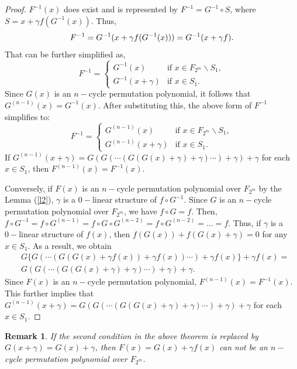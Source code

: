 \documentclass[12pt,a4paper]{article}
\newtheorem{remark}{Remark}[section]
\begin{document}
\begin{proof}
    $ F^{-1}(x) $ does exist and is represented by  $ F^{-1}=G^{-1}\circ S $, where $ S=x+\gamma f(G^{-1}(x)) $. Thus,
	\begin{equation}
		F^{-1}=G^{-1}(x+\gamma f(G^{-1}(x)))\\
		=G^{-1}(x+\gamma f).
	\end{equation}
	That can be further simplified as,
	\begin{equation}
		F^{-1}=\begin{cases}
			G^{-1}(x) & \text{if } x\in F_{2^{m}}\backslash S_{1},\\
			G^{-1}(x+\gamma) & \text{if } x\in S_{1}.
		\end{cases}
	\end{equation}
	Since $ G(x) $ is an $ n-$cycle permutation polynomial, it follows that $ G^{(n-1)}(x)=G^{-1}(x) $. After substituting this, the above form of $F^{-1}$ simplifies to:
	\begin{equation}
		F^{-1}=\begin{cases}
			G^{(n-1)}(x) & \text{if } x\in F_{2^{m}}\backslash S_{1},\\
			G^{(n-1)}(x+\gamma) & \text{if } x\in S_{1}.
		\end{cases}
	\end{equation}
	If $G^{(n-1)}(x+\gamma)=G(G(\cdots(G(G(x)+\gamma )+\gamma )\cdots)+\gamma )+\gamma  $ for each $x\in S_{1}$, then $ F^{(n-1)}(x)=F^{-1}(x) $.
	
	Conversely, if $ F(x) $ is an $ n-$cycle permutation polynomial over $ F_{2^{m}} $ by the Lemma (\ref{l2}), $ \gamma $ is a $0-$linear structure of $ f\circ G^{-1} $. Since $ G $ is an $ n-$cycle permutation polynomial over $ F_{2^{m}} $, we have $ f\circ G=f $. Then, $ f\circ G^{-1}=f\circ G ^{(n-1)}=f\circ G \circ G^{(n-2)}=f\circ G^{(n-2)}=\ldots=f $. Thus, if $ \gamma $ is a $0-$linear structure of $ f(x) $,  then $ f(G(x))+f(G(x)+\gamma)=0 $ for any $ x\in S_{1} $. As a result, we obtain
	\begin{equation}
		\begin{split}
			&G\{G(\cdots(G(G(x)+\gamma f(x) )+\gamma f(x) )\cdots)+\gamma f(x)\}+\gamma f(x)=\\ &G(G(\cdots(G(G(x)+\gamma )+\gamma )\cdots)+\gamma )+\gamma.
		\end{split}
	\end{equation}
	Since $ F(x) $ is an $ n-$cycle permutation polynomial, $ F^{(n-1)}(x)=F^{-1}(x) $. This further implies that $G^{(n-1)}(x+\gamma)=G(G(\cdots(G(G(x)+\gamma )+\gamma )\cdots)+\gamma )+\gamma  $ for each $x\in S_{1}$.
\end{proof}
\begin{remark}
	If the second condition in the above theorem is replaced by $ G(x+\gamma)=G(x)+\gamma $, then  $ F(x)=G(x)+\gamma f(x) $ can not be an $ n-$cycle permutation polynomial over $ F_{2^{m}} $.
\end{remark}
\end{document}
